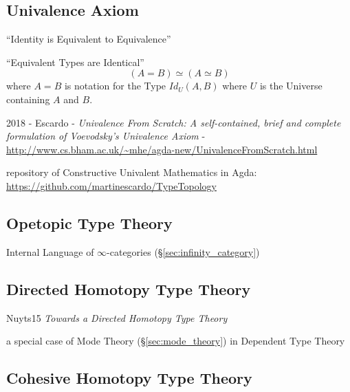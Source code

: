 \subsection{Univalence Axiom}\label{sec:univalence_axiom}

``Identity is Equivalent to Equivalence''

``Equivalent Types are Identical''
\[
  (A = B) \simeq (A \simeq B)
\]
where $A = B$ is notation for the Type $Id_U(A,B)$ where $U$ is the
Universe containing $A$ and $B$.

2018 - Escardo - \emph{Univalence From Scratch: A self-contained, brief and
  complete formulation of Voevodsky's Univalence Axiom}
- \url{http://www.cs.bham.ac.uk/~mhe/agda-new/UnivalenceFromScratch.html}

repository of Constructive Univalent Mathematics in Agda:
\url{https://github.com/martinescardo/TypeTopology}



\subsection{Opetopic Type Theory}\label{sec:opetopic_typetheory}

Internal Language of $\infty$-categories
(\S\ref{sec:infinity_category})



\subsection{Directed Homotopy Type Theory}\label{sec:directed_hott}

Nuyts15 \emph{Towards a Directed Homotopy Type Theory}

a special case of Mode Theory (\S\ref{sec:mode_theory}) in Dependent
Type Theory



\subsection{Cohesive Homotopy Type Theory}\label{sec:cohesive_hott}

